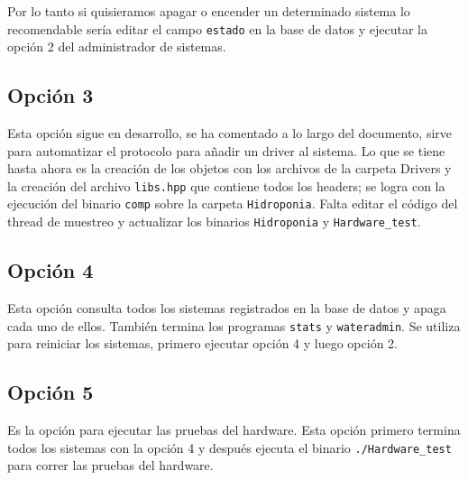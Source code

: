 \documentclass[10pt,twocolumn]{article}
\begin{document}
Por lo tanto si quisieramos apagar o encender un determinado sistema lo 
recomendable 
ser\'ia editar el campo \verb|estado| en la base de datos y ejecutar la opci\'on 2 del administrador de sistemas.

\subsection{Opci\'on 3}
Esta opci\'on sigue en desarrollo, se ha comentado a lo largo del documento, sirve para automatizar el protocolo para a\~nadir un driver al sistema. Lo que se tiene hasta 
ahora es la creaci\'on de los objetos con los archivos de la carpeta Drivers y la creaci\'on del archivo \verb|libs.hpp| que 
contiene todos los headers; se logra con la ejecuci\'on del binario \verb|comp| sobre la carpeta \verb|Hidroponia|. Falta editar el c\'odigo del thread de muestreo y 
actualizar los binarios \verb|Hidroponia| y 
\verb|Hardware_test|.

\subsection{Opci\'on 4}
Esta opci\'on consulta todos los sistemas registrados en la base de datos y apaga cada uno de ellos. Tambi\'en termina los programas \verb|stats| y \verb|wateradmin|. 
Se utiliza para reiniciar los sistemas, primero ejecutar opci\'on 4 y luego opci\'on 2.

\subsection{Opci\'on 5}
Es la opci\'on para ejecutar las pruebas del hardware. Esta opci\'on primero termina todos los sistemas con la opci\'on 4 y despu\'es ejecuta el 
binario \verb|./Hardware_test| para correr las pruebas del hardware.
\end{document}
